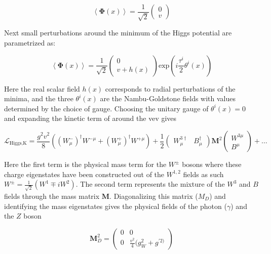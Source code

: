 \begin{equation}
\left\langle \boldsymbol{\Phi}(x) \right\rangle = \frac{1}{\sqrt{2}} \left(
\begin{matrix} 0 \\ v \end{matrix} \right)
\end{equation} 

Next small perturbations around the minimum of the Higgs
potential are parametrized as:

\begin{equation} \label{eq:higgs:broken_higgs}
\left\langle \boldsymbol{\Phi}(x) \right\rangle = \frac{1}{\sqrt{2}} \left(
\begin{matrix} 0 \\ v + h(x) \end{matrix} \right) \text{exp} \left(
i\frac{\tau^{i}}{2}\theta^{i}(x) \right)
\end{equation} 

Here the real scalar field $h(x)$ corresponds to radial perturbations of the
minima, and the three $\theta^{i}(x)$ are the Nambu-Goldstone fields with
values determined by the choice of gauge.  Choosing the unitary gauge of
$\theta^{i}(x) = 0$ and expanding the kinetic term of
 around the vev gives

\begin{equation} \label{eq:higgs:boson_masses}
\mathcal{L}_{\text{Higgs},\text{K}} = \frac{g^{2}v^{2}}{8} \left(
(W_{\mu}^{-})^{\dagger}W^{-\mu} + (W_{\mu}^{+})^{\dagger}W^{+\mu} \right) +
\frac{1}{2} \left( \begin{matrix} W_{\mu}^{3\dagger} & B_{\mu}^{\dagger}
\end{matrix} \right) \boldsymbol{M}^{2} \left( \begin{matrix} W^{3\mu} \\ B^{\mu}
\end{matrix} \right) + \ldots 
\end{equation}

Here the first term is the physical mass term for the $W^{\pm}$ bosons where
these charge eigenstates have been constructed out of the $W^{1,2}$ fields as
such $W^{\pm} = \frac{1}{\sqrt{2}}(W^{1} \mp iW^{2})$.  The second term
represents the mixture of the $W^{3}$ and $B$ fields through the mass matrix
$\boldsymbol{M}$.  Diagonalizing this matrix ($M_{D}$) and identifying the mass
eigenstates gives the physical fields of the photon ($\gamma$) and the $Z$
boson

\begin{equation}
\boldsymbol{M}_{D}^{2} = \left( \begin{matrix} 0 & 0 \\ 0 &
\frac{v^{2}}{4}(g_{W}^{2} + g^{'2)}   \end{matrix} \right)
\end{equation}

